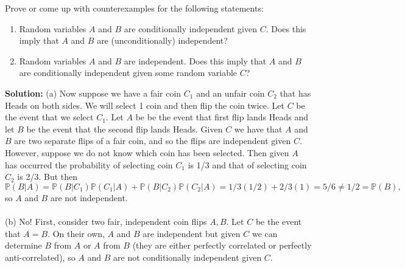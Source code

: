 \documentclass{harvardml}
\theoremstyle{definition}
\theoremstyle{plain}
\begin{document}
\begin{problem}
Prove or come up with counterexamples for the following statements:
    \begin{enumerate}[label=(\alph*)]
        \item  Random variables $A$ and $B$ are conditionally independent given $C$.  Does this imply that $A$ and $B$ are (unconditionally) independent?
        \item  Random variables $A$ and $B$ are independent.  Does this imply that $A$ and $B$ are conditionally independent given some random variable $C$?
    \end{enumerate}

\noindent \textbf{Solution:} 
(a) Now suppose we have a fair coin $C_1$ and an unfair coin $C_2$ that has Heads on both sides. We will select 1 coin and then flip the coin twice. Let $C$ be the event that we select $C_1$. Let $A$ be be the event that first flip lands Heads and let $B$ be the event that the second flip lands Heads. Given $C$ we have that $A$ and $B$ are two separate flips of a fair coin, and so the flips are independent given $C$. However, suppose we do not know which coin has been selected. Then given $A$ has occurred the probability of selecting coin $C_1$ is 1/3 and that of selecting coin $C_2$ is 2/3. But then $\mathbb P(B|A) = \mathbb P(B|C_1)\mathbb P(C_1|A) + \mathbb P(B|C_2)\mathbb P(C_2|A) = 1/3(1/2) + 2/3(1) = 5/6 \neq 1/2 = \mathbb P(B),$ so $A$ and $B$ are not independent.
\\
\\
(b) No! First, consider two fair, independent coin flips $A, B$. Let $C$ be the event that $A=B$. On their own, $A$ and $B$ are independent but given $C$ we can determine $B$ from $A$ or $A$ from $B$ (they are either perfectly correlated or perfectly anti-correlated), so $A$ and $B$ are not conditionally independent given $C$.
\end{problem}
		   
\end{document}
